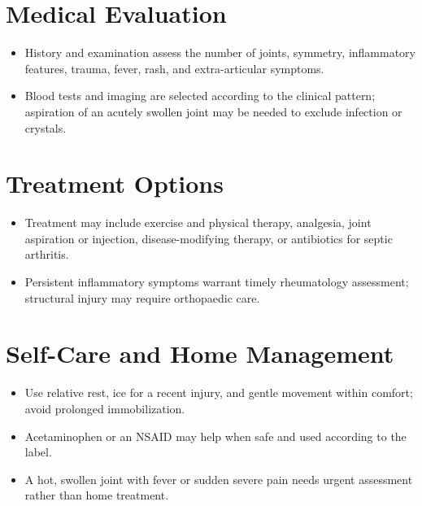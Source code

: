 \section*{Medical Evaluation}
\begin{itemize}
  \item History and examination assess the number of joints, symmetry, inflammatory features, trauma, fever, rash, and extra-articular symptoms.
  \item Blood tests and imaging are selected according to the clinical pattern; aspiration of an acutely swollen joint may be needed to exclude infection or crystals.
\end{itemize}

\section*{Treatment Options}
\begin{itemize}
  \item Treatment may include exercise and physical therapy, analgesia, joint aspiration or injection, disease-modifying therapy, or antibiotics for septic arthritis.
  \item Persistent inflammatory symptoms warrant timely rheumatology assessment; structural injury may require orthopaedic care.
\end{itemize}

\section*{Self-Care and Home Management}
\begin{itemize}
  \item Use relative rest, ice for a recent injury, and gentle movement within comfort; avoid prolonged immobilization.
  \item Acetaminophen or an NSAID may help when safe and used according to the label.
  \item A hot, swollen joint with fever or sudden severe pain needs urgent assessment rather than home treatment.
\end{itemize}


